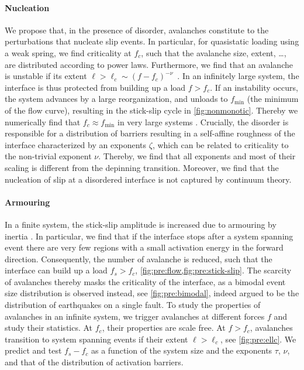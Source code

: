 \documentclass{goose-article}
\begin{document}
\paragraph{Nucleation}

We propose that, in the presence of disorder, avalanches constitute to the perturbations that nucleate slip events.
In particular, for quasistatic loading using a weak spring, we find criticality at $f_c$, such that the avalanche size, extent, \dots, are distributed according to power laws.
Furthermore, we find that an avalanche is unstable if its extent $\ell > \ell_c \sim (f - f_c)^{-\nu}$~\cite{deGeus2022,deGeus2024a}.
In an infinitely large system, the interface is thus protected from building up a load $f > f_c$.
If an instability occurs, the system advances by a large reorganization, and unloads to $f_{\min}$ (the minimum of the flow curve), resulting in the stick-slip cycle in \cref{fig:nonmonotic}.
Thereby we numerically find that $f_c \approx f_{\min}$ in very large systems \cite{deGeus2022,deGeus2024a,deGeus2019}.
Crucially, the disorder is responsible for a distribution of barriers resulting in a self-affine roughness of the interface characterized by an exponents $\zeta$, which can be related to criticality to the non-trivial exponent $\nu$.
Thereby, we find that all exponents and most of their scaling is different from the depinning transition.
Moreover, we find that the nucleation of slip at a disordered interface is not captured by continuum theory.

\paragraph{Armouring}

In a finite system, the stick-slip amplitude is increased due to armouring by inertia \cite{deGeus2019,ElSergany2023}.
In particular, we find that if the interface stops after a system spanning event there are very few regions with a small activation energy in the forward direction.
Consequently, the number of avalanche is reduced, such that the interface can build up a load $f_s > f_c$, \cref{fig:pre:flow,fig:pre:stick-slip}.
The scarcity of avalanches thereby masks the criticality of the interface, as a bimodal event size distribution is observed instead, see \cref{fig:pre:bimodal}, indeed argued to be the distribution of earthquakes on a single fault.
To study the properties of avalanches in an infinite system, we trigger avalanches at different forces $f$ and study their statistics.
At $f_c$, their properties are scale free.
At $f > f_c$, avalanches transition to system spanning events if their extent $\ell > \ell_c$, see \cref{fig:pre:ellc}.
We predict and test $f_s - f_c$ as a function of the system size and the exponents $\tau$, $\nu$, and that of the distribution of activation barriers.
\end{document}
